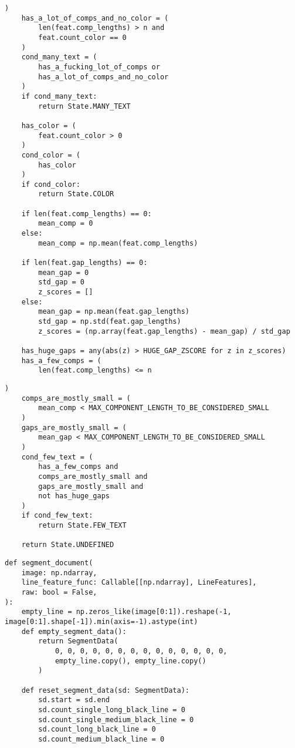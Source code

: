 \begin{lstlisting}[caption={Функция классификации строки (часть 2)}, label={lst:}]
    )
    has_a_lot_of_comps_and_no_color = (
        len(feat.comp_lengths) > n and
        feat.count_color == 0
    )
    cond_many_text = (
        has_a_fucking_lot_of_comps or
        has_a_lot_of_comps_and_no_color
    )
    if cond_many_text:
        return State.MANY_TEXT

    has_color = (
        feat.count_color > 0
    )
    cond_color = (
        has_color
    )
    if cond_color:
        return State.COLOR

    if len(feat.comp_lengths) == 0:
        mean_comp = 0
    else:
        mean_comp = np.mean(feat.comp_lengths)

    if len(feat.gap_lengths) == 0:
        mean_gap = 0
        std_gap = 0
        z_scores = []
    else:
        mean_gap = np.mean(feat.gap_lengths)
        std_gap = np.std(feat.gap_lengths)
        z_scores = (np.array(feat.gap_lengths) - mean_gap) / std_gap

    has_huge_gaps = any(abs(z) > HUGE_GAP_ZSCORE for z in z_scores)
    has_a_few_comps = (
        len(feat.comp_lengths) <= n
\end{lstlisting}

\begin{lstlisting}[caption={Функция классификации строки (часть 3)}, label={lst:}]
    )
    comps_are_mostly_small = (
        mean_comp < MAX_COMPONENT_LENGTH_TO_BE_CONSIDERED_SMALL
    )
    gaps_are_mostly_small = (
        mean_gap < MAX_COMPONENT_LENGTH_TO_BE_CONSIDERED_SMALL
    )
    cond_few_text = (
        has_a_few_comps and
        comps_are_mostly_small and
        gaps_are_mostly_small and
        not has_huge_gaps
    )
    if cond_few_text:
        return State.FEW_TEXT

    return State.UNDEFINED
\end{lstlisting}

\begin{lstlisting}[caption={Функция для создания первичной или уточненной разметки (часть 1)}, label={lst:sd}]
def segment_document(
    image: np.ndarray,
    line_feature_func: Callable[[np.ndarray], LineFeatures],
    raw: bool = False,
):
    empty_line = np.zeros_like(image[0:1]).reshape(-1, image[0:1].shape[-1]).min(axis=-1).astype(int)
    def empty_segment_data():
        return SegmentData(
            0, 0, 0, 0, 0, 0, 0, 0, 0, 0, 0, 0, 0, 0,
            empty_line.copy(), empty_line.copy()
        )

    def reset_segment_data(sd: SegmentData):
        sd.start = sd.end
        sd.count_single_long_black_line = 0
        sd.count_single_medium_black_line = 0
        sd.count_long_black_line = 0
        sd.count_medium_black_line = 0
\end{lstlisting}

